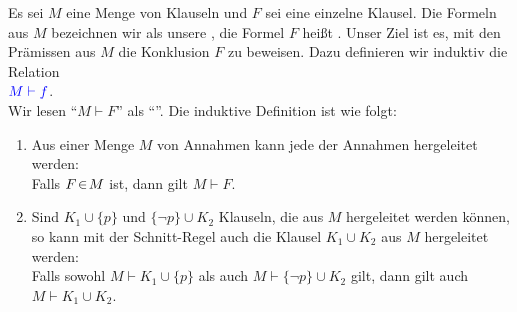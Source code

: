 \begin{Definition}
    Es sei $M$ eine Menge von Klauseln  und $F$ sei eine einzelne Klausel.  
    Die Formeln aus $M$ bezeichnen wir als unsere , die Formel
    $F$ heißt .  Unser Ziel ist es, mit den Prämissen aus $M$
    die Konklusion $F$ zu beweisen.  Dazu definieren wir induktiv die Relation \\[0.2cm]
    \hspace*{1.3cm}
    ${\color{blue}M \vdash f}$. \\[0.2cm]
    Wir lesen ``$M \vdash F$'' als ``''.  Die induktive Definition ist
    wie folgt:
    \begin{enumerate}
    \item Aus einer Menge $M$ von Annahmen kann jede der Annahmen hergeleitet werden: \\[0.2cm]
          \hspace*{1.3cm} 
          Falls $F \!\in\! M$ ist, dann gilt  $M \vdash F$.
    \item Sind $K_1 \cup \{p\}$ und $\{ \neg p \} \cup K_2$ Klauseln, die aus $M$
          hergeleitet werden können, so kann mit der Schnitt-Regel auch die Klausel $K_1 \cup K_2$ aus $M$
          hergeleitet werden: \\[0.2cm]
          \hspace*{1.3cm} 
          Falls sowohl $M \vdash K_1 \cup \{p\}$ als auch $M \vdash \{ \neg p \} \cup K_2$
          gilt, dann gilt auch $M \vdash K_1 \cup K_2$.
    \eox
    \end{enumerate}
\end{Definition}




